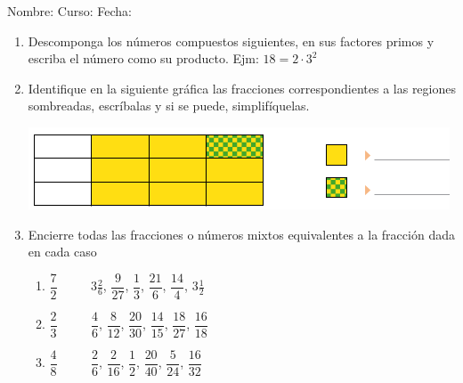 \documentclass[fleqn]{article}
\newcommand{\LineaNombre}{%
\par
\vspace{\baselineskip}
Nombre:\hrulefill \; Curso: \underline{\hspace*{48pt}} \; Fecha: \underline{\hspace*{2.5cm}} \relax
\par}
\begin{document}
\LineaNombre
\begin{enumerate}
 \item Descomponga los números compuestos siguientes, en sus factores primos y escriba el número como su producto. Ejm: $18=2\cdot 3^{2}$
 \begin{enumerate}
 \end{enumerate}
 \noanswer
 \item Identifique en la siguiente gráfica las fracciones correspondientes a las regiones sombreadas, escríbalas y si se puede, simplifíquelas.
   \begin{center}
     \includegraphics[scale=.6]{Images/fraccion.png}
   \end{center}
   \noanswer[.25in]
 \item Encierre todas las fracciones o números mixtos equivalentes a la fracción dada en cada caso
 \begin{enumerate}
 \item $\dfrac{7}{2}$ $\qquad$ $3\frac{2}{6}$, $\dfrac{9}{27}$, $\dfrac{1}{3}$, $\dfrac{21}{6}$, $\dfrac{14}{4}$, $3\frac{1}{2}$\noanswer[.1in]
 \newpage
  \item $\dfrac{2}{3}$ $\qquad$ $\dfrac{4}{6}$, $\dfrac{8}{12}$, $\dfrac{20}{30}$, $\dfrac{14}{15}$, $\dfrac{18}{27}$, $\dfrac{16}{18}$ \noanswer[.1in]
  \item $\dfrac{4}{8}$ $\qquad$ $\dfrac{2}{6}$, $\dfrac{2}{16}$, $\dfrac{1}{2}$, $\dfrac{20}{40}$, $\dfrac{5}{24}$, $\dfrac{16}{32}$


\end{enumerate}
\end{enumerate}
\end{document}
